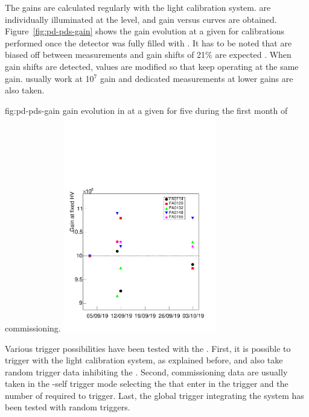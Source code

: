 The  gains are calculated regularly with the light calibration system.  are individually illuminated at the  level, and gain versus   curves are obtained. Figure~\ref{fig:pd-pds-gain} shows the gain evolution at a given  for calibrations performed once the detector was fully filled with . It has to be noted that  are biased off between measurements and gain shifts of 21\% are expected \cite{Belver:2018erf}. When gain shifts are detected,  values are modified so that  keep operating at the same gain.  usually work at 10$^7$ gain and dedicated measurements at lower gains are also taken.

\begin{dunefigure}{fig:pd-pds-gain} { gain evolution in  at a given  for five  during the first month of commissioning.}
\includegraphics[width=0.5\textwidth]{graphics/dppd_gain.pdf}
\end{dunefigure}

Various trigger possibilities have been tested with the  . First, it is possible to trigger with the light calibration system, as explained before, and also take random trigger data inhibiting the . Second, commissioning data are usually taken in the -self trigger mode selecting the  that enter in the trigger and the number of  required to trigger. Last, the global  trigger integrating the  system has been tested with random triggers.


